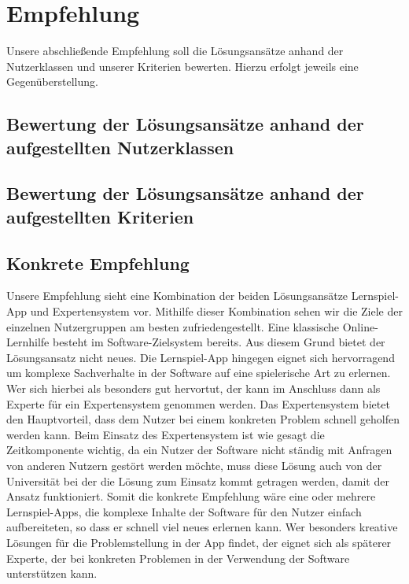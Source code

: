 \chapter{Empfehlung}
Unsere abschließende Empfehlung soll die Lösungsansätze anhand der Nutzerklassen und unserer Kriterien bewerten. Hierzu erfolgt jeweils eine Gegenüberstellung.
\section{Bewertung der Lösungsansätze anhand der aufgestellten Nutzerklassen}
\section{Bewertung der Lösungsansätze anhand der aufgestellten Kriterien}

\section{Konkrete Empfehlung}
Unsere Empfehlung sieht eine Kombination der beiden Lösungsansätze Lernspiel-App und Expertensystem vor. Mithilfe dieser Kombination sehen wir die Ziele der einzelnen Nutzergruppen am besten zufriedengestellt. Eine klassische Online-Lernhilfe besteht im Software-Zielsystem bereits. Aus diesem Grund bietet der Lösungsansatz nicht neues. Die Lernspiel-App hingegen eignet sich hervorragend um komplexe Sachverhalte in der Software auf eine spielerische Art zu erlernen. Wer sich hierbei als besonders gut hervortut, der kann im Anschluss dann als Experte für ein Expertensystem genommen werden. Das Expertensystem bietet den Hauptvorteil, dass dem Nutzer bei einem konkreten Problem schnell geholfen werden kann. Beim Einsatz des Expertensystem ist wie gesagt die Zeitkomponente wichtig, da ein Nutzer der Software nicht ständig mit Anfragen von anderen Nutzern gestört werden möchte, muss diese Lösung auch von der Universität bei der die Lösung zum Einsatz kommt getragen werden, damit der Ansatz funktioniert. Somit die konkrete Empfehlung wäre eine oder mehrere Lernspiel-Apps, die komplexe Inhalte der Software für den Nutzer einfach aufbereiteten, so dass er schnell viel neues erlernen kann. Wer besonders kreative Lösungen für die Problemstellung in der App findet, der eignet sich als späterer Experte, der bei konkreten Problemen in der Verwendung der Software unterstützen kann.


